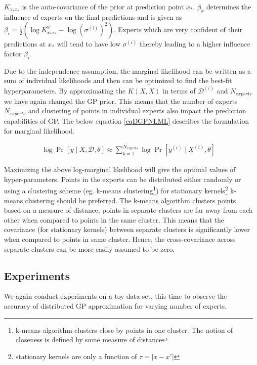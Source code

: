 \(K_{x_{*}x_{*}}\) is the auto-covariance of the prior at prediction point \(x_{*}\). \(\beta_{k}\) determines the influence of experts on the final predictions \cite{cao2014generalized} and is given as \(\beta_{i} = \frac{1}{2}(\log K_{x_{*}x_{*}}^{2} - \log(\sigma^{(i)})^{2})\). Experts which are very confident of their predictions at \(x_{*}\) will tend to have low \(\sigma^{(i)}\) thereby leading to a higher influence factor \(\beta_{i}\).

Due to the independence assumption, the marginal likelihood can be written as a sum of individual likelihoods and then can be optimized to find the best-fit hyperparameters. By approximating the \(K(X, X)\) in terms of \(\mathcal{D}^{(i)}\) and \(N_{experts}\) we have again changed the GP prior. This means that the number of experts \(N_{experts}\) and clustering of points in individual experts also impact the prediction capabilities of GP. The below equation \ref{eqDGPNLML} describes the formulation for marginal likelihood. 

\begin{align}\label{eqDGPNLML}
    \log \Pr[y \mid X, \mathcal{D}, \theta] \approx \sum_{k=1}^{N_{experts}} \log \Pr[y^{(i)}\mid X^{(i)}, \theta]
 \end{align}

Maximizing the above log-marginal likelihood will give the optimal values of hyper-parameters. Points in the experts can be distributed either randomly or using a clustering scheme (eg. k-means clustering\footnote{k-means algorithm clusters close by points in one cluster. The notion of closeness is defined by some measure of distance}) for stationary kernels\footnote{stationary kernels are only a function of \(\tau = |x-x'|\)} k-means clustering should be preferred. The k-means algorithm clusters points based on a measure of distance, points in separate clusters are far away from each other when compared to points in the same cluster. This means that the covariance (for stationary kernels) between separate clusters is significantly lower when compared to points in same cluster. Hence, the cross-covariance across separate clusters can be more easily assumed to be zero.

\subsection{Experiments}\label{subSecDistributedExperiments}
We again conduct experiments on a toy-data set, this time to observe the accuracy of distributed GP approximation for varying number of experts. 


